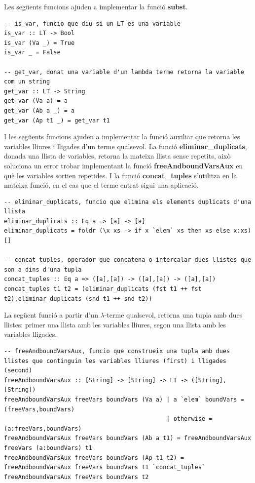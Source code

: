 \documentclass[10pt,a4paper]{article}
\begin{document}
Les següents funcions ajuden a implementar la funció \textbf{subst}.

\lstset{language=Haskell, breaklines=true, basicstyle=\footnotesize}
\begin{lstlisting}[frame=mystyle]
-- is_var, funcio que diu si un LT es una variable
is_var :: LT -> Bool
is_var (Va _) = True
is_var _ = False

-- get_var, donat una variable d'un lambda terme retorna la variable com un string
get_var :: LT -> String
get_var (Va a) = a
get_var (Ab a _) = a
get_var (Ap t1 _) = get_var t1
\end{lstlisting}

I les següents funcions ajuden a implementar la funció auxiliar que retorna les variables lliures i lligades d'un terme qualsevol. La funció \textbf{eliminar\_duplicats}, donada una llista de variables, retorna la mateixa llista sense repetits, això soluciona un error trobar implementant la funció \textbf{freeAndboundVarsAux} en què les variables sortien repetides. I la funció \textbf{concat\_tuples} s'utilitza en la mateixa funció, en el cas que el terme entrat sigui una aplicació.

\lstset{language=Haskell, breaklines=true, basicstyle=\footnotesize}
\begin{lstlisting}[frame=mystyle]
-- eliminar_duplicats, funcio que elimina els elements duplicats d'una llista
eliminar_duplicats :: Eq a => [a] -> [a]
eliminar_duplicats = foldr (\x xs -> if x `elem` xs then xs else x:xs) []

-- concat_tuples, operador que concatena o intercalar dues llistes que son a dins d'una tupla
concat_tuples :: Eq a => ([a],[a]) -> ([a],[a]) -> ([a],[a])
concat_tuples t1 t2 = (eliminar_duplicats (fst t1 ++ fst t2),eliminar_duplicats (snd t1 ++ snd t2))
\end{lstlisting}

La següent funció a partir d'un $\lambda$-terme qualsevol, retorna una tupla amb dues llistes: primer una llista amb les variables lliures, segon una llista amb les variables lligades.

\lstset{language=Haskell, breaklines=true, basicstyle=\footnotesize}
\begin{lstlisting}[frame=mystyle]
-- freeAndboundVarsAux, funcio que construeix una tupla amb dues llistes que continguin les variables lliures (first) i lligades (second)
freeAndboundVarsAux :: [String] -> [String] -> LT -> ([String],[String])
freeAndboundVarsAux freeVars boundVars (Va a) | a `elem` boundVars = (freeVars,boundVars)
                                              | otherwise = (a:freeVars,boundVars)
freeAndboundVarsAux freeVars boundVars (Ab a t1) = freeAndboundVarsAux freeVars (a:boundVars) t1
freeAndboundVarsAux freeVars boundVars (Ap t1 t2) = freeAndboundVarsAux freeVars boundVars t1 `concat_tuples` freeAndboundVarsAux freeVars boundVars t2
\end{lstlisting}
\end{document}
